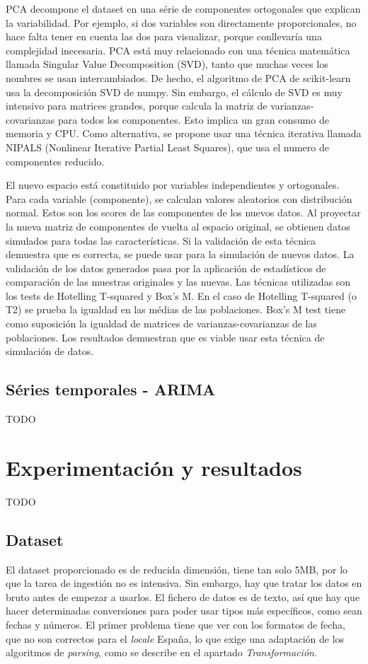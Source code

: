 \documentclass[11pt,spanish,listoffigures,listoftables]{tfgetsinf}
\begin{document}
    PCA decompone el dataset en una série de componentes ortogonales que explican la variabilidad. Por ejemplo, si dos variables son directamente proporcionales, no hace falta tener en cuenta las dos para visualizar, porque conllevaría una complejidad inecesaria. PCA está muy relacionado con una técnica matemática llamada Singular Value Decomposition (SVD), tanto que muchas veces los nombres se usan intercambiados. De hecho, el algoritmo de PCA de scikit-learn usa la decomposición SVD de numpy. Sin embargo, el cálculo de SVD es muy intensivo para matrices grandes, porque calcula la matriz de varianzas-covarianzas para todos los componentes. Esto implica un gran consumo de memoria y CPU. Como alternativa, se propone usar una técnica iterativa llamada NIPALS (Nonlinear Iterative Partial Least Squares), que usa el numero de componentes reducido.
    
    El nuevo espacio está constituido por variables independientes y ortogonales. Para cada variable (componente), se calculan valores aleatorios con distribución normal. Estos son los scores de las componentes de los nuevos datos. Al proyectar la nueva matriz de componentes de vuelta al espacio original, se obtienen datos simulados para todas las características. Si la validación de esta técnica demuestra que es correcta, se puede usar para la simulación de nuevos datos. La validación de los datos generados pasa por la aplicación de estadísticos de comparación de las muestras originales y las nuevas. Las técnicas utilizadas son los tests de Hotelling T-squared y Box's M. En el caso de Hotelling T-squared (o T2) se prueba la igualdad en las médias de las poblaciones. Box's M test tiene como suposición la igualdad de matrices de varianzas-covarianzas de las poblaciones. Los resultados demuestran que es viable usar esta técnica de simulación de datos.

    \section{Séries temporales - ARIMA}
    TODO

\chapter{Experimentación y resultados}
TODO

    \section{Dataset}
    El dataset proporcionado es de reducida dimensión, tiene tan solo 5MB, por lo que la tarea de ingestión no es intensiva. Sin embargo, hay que tratar los datos en bruto antes de empezar a usarlos. El fichero de datos es de texto, así que hay que hacer determinadas conversiones para poder usar tipos más específicos, como sean fechas y números. El primer problema tiene que ver con los formatos de fecha, que no son correctos para el {\em locale} España, lo que exige una adaptación de los algoritmos de {\em parsing}, como se describe en el apartado {\em Transformación}.
    
\end{document}

